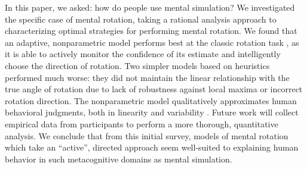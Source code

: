 \documentclass{article} %
\newcommand{\TODO}[1]{\textcolor{red}{[TODO: #1]}}
\begin{document}
In this paper, we asked: how do people use mental simulation?  We
investigated the specific case of mental rotation, taking a rational
analysis approach to characterizing optimal strategies for performing
mental rotation. We found that an adaptive, nonparametric model
performs best at the classic rotation task \cite{Shepard1971}, as it
is able to actively monitor the confidence of its estimate and
intelligently choose the direction of rotation. Two simpler models
based on heuristics performed much worse: they did not maintain the
linear relationship with the true angle of rotation due to lack of
robustness against local maxima or incorrect rotation direction. The
nonparametric model qualitatively approximates human behavioral
judgments, both in linearity \cite{Shepard1971} and variability
\cite{Just1976}. Future work will collect empirical data from
participants to perform a more thorough, quantitative analysis.  We
conclude that from this initial survey, models of mental rotation
which take an ``active'', directed approach seem well-suited to
explaining human behavior in such metacognitive domains as mental
simulation.







\renewcommand\refname{\normalsize{References}}


\end{document}
